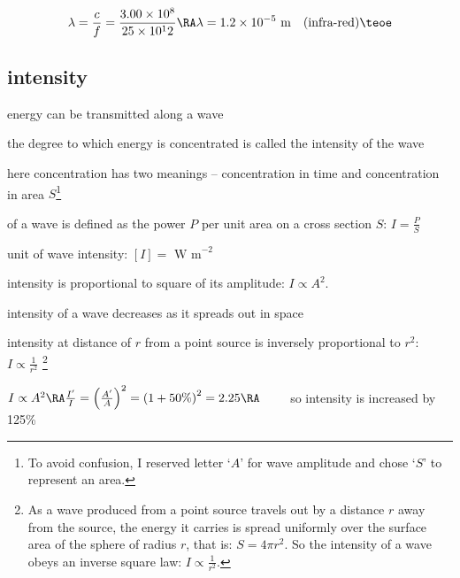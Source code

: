 \solc\begin{equation*}
	\lambda = \frac{c}{f} = \frac{3.00\times10^8}{25\times10^12} \RA \lambda = 1.2 \times 10^{-5} \text{ m} \quad \text{(infra-red)} \teoe
\end{equation*}


	

\subsection{intensity}

energy can be transmitted along a wave

the degree to which energy is concentrated is called the intensity of the wave

here concentration has two meanings -- concentration in time and concentration in area $S$\footnote{To avoid confusion, I reserved letter `$A$' for wave amplitude and chose `$S$' to represent an area.}

\begin{ilight}
	 of a wave is defined as the power $P$ per unit area on a cross section $S$: $\boxed{I=\frac{P}{S}}$
\end{ilight}

\cmt unit of wave intensity: $[I] = \text{ W m}^{-2}$

\cmt intensity is proportional to square of its amplitude: $\boxed{I \propto A^2}$.

\cmt intensity of a wave decreases as it spreads out in space

intensity at distance of $r$ from a point source is inversely proportional to $r^2$: $\boxed{I \propto \frac{1}{r^2}}$
\footnote{As a wave produced from a point source travels out by a distance $r$ away from the source, the energy it carries is spread uniformly over the surface area of the sphere of radius $r$, that is: $S=4\pi r^2$. So the intensity of a wave obeys an inverse square law: $I \propto \frac{1}{r^2}$.}


\sol $I \propto A^2 \RA \frac{I'}{I} = \left( \frac{A'}{A} \right)^2 = \left( 1 + 50\% \right)^2 =2.25 \RA \qquad$ so intensity is increased by 125\% \eoe

\newpage



